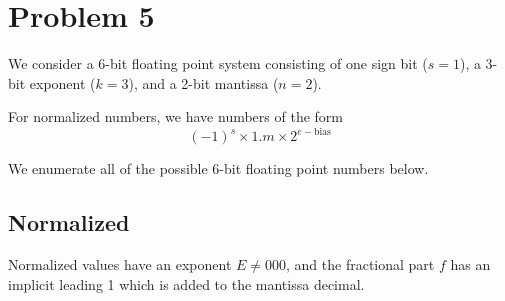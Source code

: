 \documentclass{article}
\begin{document}
\section*{Problem 5}
We consider a 6-bit floating point system consisting of one sign bit ($s=1$), a 3-bit exponent ($k=3$), and a 2-bit mantissa ($n=2$). 

For normalized numbers, we have numbers of the form $$(-1)^s \times 1.m \times 2^{e-\text{bias}}$$

We enumerate all of the possible 6-bit floating point numbers below. 

\subsection*{Normalized}
Normalized values have an exponent $E \ne 000$, and the fractional part $f$ has an implicit leading 1 which is added to the mantissa decimal.
\end{document}
